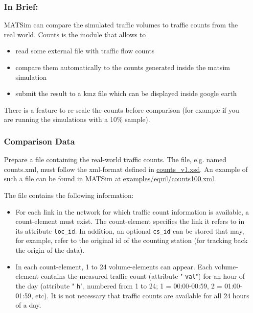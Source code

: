 \documentclass[a4paper,11pt]{report}
\begin{document}
\subsubsection{\textbf{In Brief:}}

MATSim can compare the simulated traffic volumes to traffic counts from the real world. Counts is the module that allows to
\begin{itemize}
	\item read some external file with traffic flow counts
	\item compare them automatically to the counts generated inside the matsim simulation
	\item submit the result to a kmz file which can be displayed inside google earth
\end{itemize}

There is a feature to re-scale the counts before comparison (for example if you are running the simulations with a 10\% sample).

\subsubsection{Comparison Data}

Prepare a file containing the real-world traffic counts. The file, e.g. named counts.xml, must follow the xml-format defined in \href{http://matsim.org/files/dtd/counts_v1.xsd}{counts\_v1.xsd}. An example of such a file can be found in MATSim at \href{http://matsim.svn.sourceforge.net/viewvc/matsim/matsim/trunk/examples/equil/counts100.xml?content-type=text%2Fplain}{examples/equil/counts100.xml}.

The file contains the following information:
\begin{itemize}
	\item For each link in the network for which traffic count information  is available, a count-element must exist. The count-element specifies  the link it refers to in its attribute 
\texttt{loc\_id}. In addition, an optional 
\texttt{cs\_id}  can be stored that may, for example, refer to the original id of the  counting station (for tracking back the origin of the data).
	\item In each count-element, 1 to 24 volume-elements can appear. Each volume-element contains the measured traffic count (attribute "
\texttt{val}") for an hour of the day (attribute "
\texttt{h}",  numbered from 1 to 24; 1 = 00:00-00:59, 2 = 01:00-01:59, etc). It is  not necessary that traffic counts are available for all 24 hours of a  day.
\end{itemize}
\end{document}
